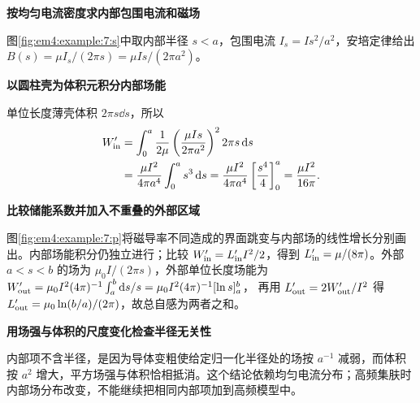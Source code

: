 \begin{solution}\textbf{按均匀电流密度求内部包围电流和磁场}\par\nobreak
图\ref{fig:em4:example:7:s}中取内部半径 $s<a$，包围电流 $I_s=I s^2/a^2$，安培定律给出 $B(s)=\mu I_s/(2\pi s)=\mu Is/(2\pi a^2)$。

\par\medskip{}\noindent\textbf{以圆柱壳为体积元积分内部场能}\par\nobreak
单位长度薄壳体积 $2\pi s\dd s$，所以
\begin{align*}W'_{\rm in}&=\int_0^a\frac{1}{2\mu}\left(\frac{\mu Is}{2\pi a^2}\right)^2 2\pi s\mathop{}\!\mathrm d s\\&=\frac{\mu I^2}{4\pi a^4}\int_0^as^3\mathop{}\!\mathrm d s
=\frac{\mu I^2}{4\pi a^4}\left[\frac{s^4}{4}\right]_0^a
=\frac{\mu I^2}{16\pi}.\end{align*}



\par\medskip{}\noindent\textbf{比较储能系数并加入不重叠的外部区域}\par\nobreak
图\ref{fig:em4:example:7:p}将磁导率不同造成的界面跳变与内部场的线性增长分别画出。内部场能积分仍独立进行；比较 $W'_{\rm in}=L'_{\rm in}I^2/2$，得到 $L'_{\rm in}=\mu/(8\pi)$。外部 $a<s<b$ 的场为 $\mu_0I/(2\pi s)$，外部单位长度场能为
$W'_{\rm out}=\mu_0I^2(4\pi)^{-1}\int_a^b\mathop{}\!\mathrm d s/s
=\mu_0I^2(4\pi)^{-1}[\ln s]_a^b$，
再用 $L'_{\rm out}=2W'_{\rm out}/I^2$ 得
$L'_{\rm out}=\mu_0\ln(b/a)/(2\pi)$，故总自感为两者之和。



\par\medskip{}\noindent\textbf{用场强与体积的尺度变化检查半径无关性}\par\nobreak
内部项不含半径，是因为导体变粗使给定归一化半径处的场按 $a^{-1}$ 减弱，而体积按 $a^2$ 增大，平方场强与体积恰相抵消。这个结论依赖均匀电流分布；高频集肤时内部场分布改变，不能继续把相同内部项加到高频模型中。\end{solution}
